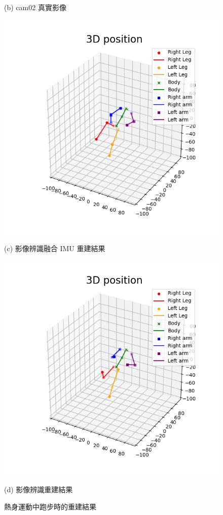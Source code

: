 \begin{figure}[!ht]
\begin{minipage}{.5\textwidth}
       \caption*{(b) cam02 真實影像}
    \end{minipage}
    \begin{minipage}{.5\textwidth}
       \centering
       \includegraphics[width=.95\linewidth]{figure/ch4_fig_warm_result_with3.png}
       \caption*{(c) 影像辨識融合 IMU 重建結果}
    \end{minipage}%
    \begin{minipage}{.5\textwidth}
       \centering
       \includegraphics[width=.95\linewidth]{figure/ch4_fig_warm_result_no3.png}
       \caption*{(d) 影像辨識重建結果}
    \end{minipage}
   \caption[熱身運動中正面腿部伸展時的重建結果]{熱身運動中跑步時的重建結果}
   \label{ch4_fig_warm_front}
\end{figure}

